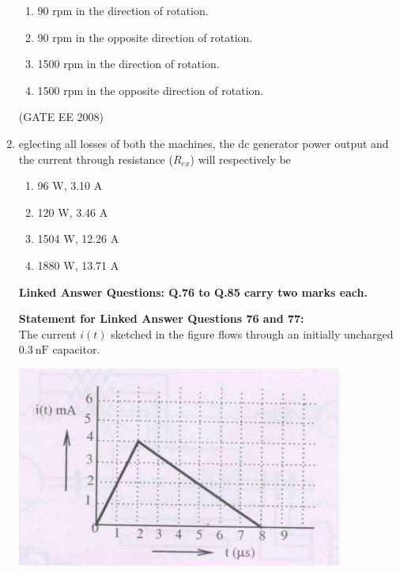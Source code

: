 \documentclass[journal,12pt,onecolumn]{IEEEtran}
\theoremstyle{remark}
\begin{document}
\begin{enumerate}[start=1, label=Q.\arabic*]
\begin{enumerate}[label=(\Alph*)]
    \item 90 rpm in the direction of rotation.
    \item 90 rpm in the opposite direction of rotation.
    \item 1500 rpm in the direction of rotation.
    \item 1500 rpm in the opposite direction of rotation.
\end{enumerate}

\hfill (GATE EE 2008) \\[5mm]

\item eglecting all losses of both the machines, the dc generator power output and the current through resistance ($R_{ex}$) will respectively be
\begin{multicols}{2}
\begin{enumerate}[label=(\Alph*)]
    \item 96 W, 3.10 A
    \item 120 W, 3.46 A
    \item 1504 W, 12.26 A
    \item 1880 W, 13.71 A
\end{enumerate}
\end{multicols}


\begin{center}
\textbf{Linked Answer Questions: Q.76 to Q.85 carry two marks each.}
\end{center}

\textbf{Statement for Linked Answer Questions 76 and 77:}\\

The current $i(t)$ sketched in the figure flows through an initially uncharged $0.3~\text{nF}$ capacitor.

\begin{center}
\includegraphics[width=\columnwidth]{Fig/comp3.png}
\end{center}


\end{enumerate}
\end{document}
